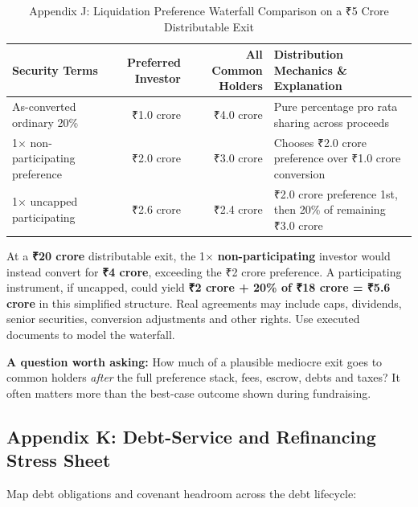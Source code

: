 \begin{table}[t]
\centering
\small
\caption{Appendix J: Liquidation Preference Waterfall Comparison on a \textnormal{₹}5 Crore Distributable Exit}
\label{tab:app_j_waterfall}
\begin{tabularx}{\textwidth}{p{4.2cm} r r X}
\toprule
\textbf{Security Terms} & \textbf{Preferred Investor} & \textbf{All Common Holders} & \textbf{Distribution Mechanics \& Explanation} \\
\midrule
As-converted ordinary 20\% & ₹1.0 crore & ₹4.0 crore & Pure percentage pro rata sharing across proceeds \\
1$\times$ non-participating preference & ₹2.0 crore & ₹3.0 crore & Chooses ₹2.0 crore preference over ₹1.0 crore conversion \\
1$\times$ uncapped participating & ₹2.6 crore & ₹2.4 crore & ₹2.0 crore preference 1st, then 20\% of remaining ₹3.0 crore \\
\bottomrule
\end{tabularx}
\end{table}

At a \textbf{\textnormal{₹}20 crore} distributable exit, the 1$\times$ \textbf{non-participating} investor would instead convert for \textbf{\textnormal{₹}4 crore}, exceeding the \textnormal{₹}2 crore preference. A participating instrument, if uncapped, could yield \textbf{\textnormal{₹}2 crore + 20\% of \textnormal{₹}18 crore = \textnormal{₹}5.6 crore} in this simplified structure. Real agreements may include caps, dividends, senior securities, conversion adjustments and other rights. Use executed documents to model the waterfall.

\textbf{A question worth asking:} How much of a plausible mediocre exit goes to common holders \textit{after} the full preference stack, fees, escrow, debts and taxes? It often matters more than the best-case outcome shown during fundraising.

\subsection{Appendix K: Debt-Service and Refinancing Stress Sheet}

Map debt obligations and covenant headroom across the debt lifecycle:

